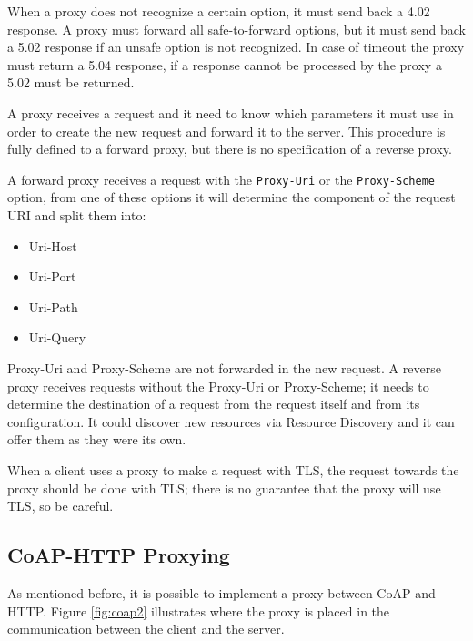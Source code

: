 	When a proxy does not recognize a certain option, it must send back a 4.02 response.\newline
	A proxy must forward all safe-to-forward options, but it must send back a 5.02 response if an unsafe option is not recognized.\newline
	In case of timeout the proxy must return a 5.04 response, if a response cannot be processed by the proxy a 5.02 must be returned.\newline
	
	A proxy receives a request and it need to know which parameters it must use in order to create the new request and forward it to the server.\newline
	This procedure is fully defined to a forward proxy, but there is no specification of a reverse proxy.\newline
	
	A forward proxy receives a request with the \texttt{Proxy-Uri} or the \texttt{Proxy-Scheme} option, from one of these options it will determine the component of the request URI and split them into:
	\begin{itemize}
		\item Uri-Host
		\item Uri-Port
		\item Uri-Path
		\item Uri-Query
	\end{itemize}

	Proxy-Uri and Proxy-Scheme are not forwarded in the new request.\newline
	A reverse proxy receives requests without the Proxy-Uri or Proxy-Scheme; it needs to determine the destination of a request from the request itself and from its configuration.\newline
	It could discover new resources via Resource Discovery and it can offer them as they were its own.\newline
	
	When a client uses a proxy to make a request with TLS, the request towards the proxy should be done with TLS; there is no guarantee that the proxy will use TLS, so be careful.\newline
	
	\subsection{CoAP-HTTP Proxying}
	As mentioned before, it is possible to implement a proxy between CoAP and HTTP.\newline
	Figure \ref{fig:coap2} illustrates where the proxy is placed in the communication between the client and the server.
	

